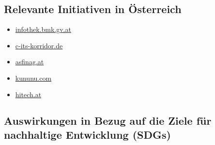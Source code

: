 \documentclass[
]{book}
\providecommand{\tightlist}{%
  \setlength{\itemsep}{0pt}\setlength{\parskip}{0pt}}
\begin{document}
\hypertarget{relevante-initiativen-in-uxf6sterreich-18}{%
\subsection*{Relevante Initiativen in Österreich}\label{relevante-initiativen-in-uxf6sterreich-18}}

\begin{itemize}
\tightlist
\item
  \href{https://infothek.bmk.gv.at/fahrer-assistenzsysteme-verkehrssicherheit-vernetzung/}{infothek.bmk.gv.at}
\item
  \href{https://c-its-korridor.de/?menuId=1\&sp=en}{c-its-korridor.de}
\item
  \href{https://www.asfinag.at/ueber-uns/newsroom/pressemeldungen/2020/wlan-ausbau-cooperative-intelligent-transport-systems/}{asfinag.at}
\item
  \href{https://www.kununu.com/de/automotive-safety-technologies/news/car2x-projekt-in-oesterreich-praesentiert}{kununu.com}
\item
  \href{https://www.hitech.at/mobilitaet/wohin-geht-die-fahrt}{hitech.at}
\end{itemize}

\hypertarget{auswirkungen-in-bezug-auf-die-ziele-fuxfcr-nachhaltige-entwicklung-sdgs-18}{%
\subsection*{Auswirkungen in Bezug auf die Ziele für nachhaltige Entwicklung (SDGs)}\label{auswirkungen-in-bezug-auf-die-ziele-fuxfcr-nachhaltige-entwicklung-sdgs-18}}
\end{document}
